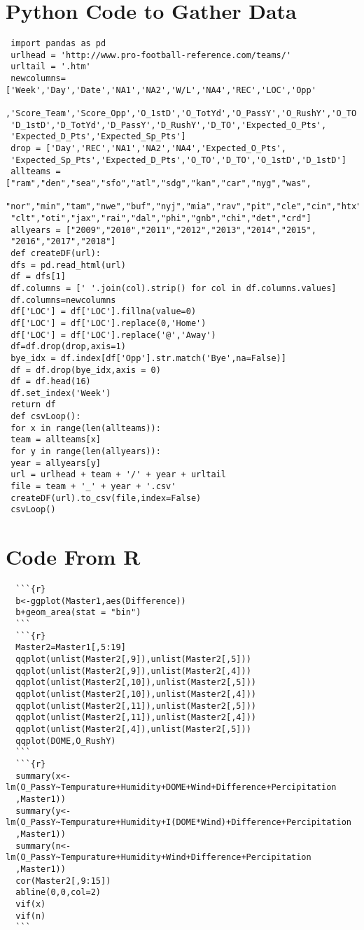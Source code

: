 \documentclass[12pt]{article}
\begin{document}
\begin{appendices}
 \section{Python Code to Gather Data}
 \begin{verbatim}
 import pandas as pd
 urlhead = 'http://www.pro-football-reference.com/teams/'
 urltail = '.htm'
 newcolumns=['Week','Day','Date','NA1','NA2','W/L','NA4','REC','LOC','Opp'
 ,'Score_Team','Score_Opp','O_1stD','O_TotYd','O_PassY','O_RushY','O_TO',
 'D_1stD','D_TotYd','D_PassY','D_RushY','D_TO','Expected_O_Pts',
 'Expected_D_Pts','Expected_Sp_Pts']
 drop = ['Day','REC','NA1','NA2','NA4','Expected_O_Pts',
 'Expected_Sp_Pts','Expected_D_Pts','O_TO','D_TO','O_1stD','D_1stD']
 allteams = ["ram","den","sea","sfo","atl","sdg","kan","car","nyg","was",
 "nor","min","tam","nwe","buf","nyj","mia","rav","pit","cle","cin","htx",
 "clt","oti","jax","rai","dal","phi","gnb","chi","det","crd"]
 allyears = ["2009","2010","2011","2012","2013","2014","2015",
 "2016","2017","2018"]
 def createDF(url):
 dfs = pd.read_html(url)
 df = dfs[1]
 df.columns = [' '.join(col).strip() for col in df.columns.values]
 df.columns=newcolumns
 df['LOC'] = df['LOC'].fillna(value=0)
 df['LOC'] = df['LOC'].replace(0,'Home')
 df['LOC'] = df['LOC'].replace('@','Away')
 df=df.drop(drop,axis=1)
 bye_idx = df.index[df['Opp'].str.match('Bye',na=False)]
 df = df.drop(bye_idx,axis = 0)
 df = df.head(16)
 df.set_index('Week')
 return df
 def csvLoop():
 for x in range(len(allteams)):
 team = allteams[x]
 for y in range(len(allyears)):
 year = allyears[y]
 url = urlhead + team + '/' + year + urltail
 file = team + '_' + year + '.csv'
 createDF(url).to_csv(file,index=False)
 csvLoop()
 \end{verbatim}
  \section{Code From R}
   \begin{verbatim}
  ```{r}
  b<-ggplot(Master1,aes(Difference))
  b+geom_area(stat = "bin")
  ```
  ```{r}
  Master2=Master1[,5:19]
  qqplot(unlist(Master2[,9]),unlist(Master2[,5]))
  qqplot(unlist(Master2[,9]),unlist(Master2[,4]))
  qqplot(unlist(Master2[,10]),unlist(Master2[,5]))
  qqplot(unlist(Master2[,10]),unlist(Master2[,4]))
  qqplot(unlist(Master2[,11]),unlist(Master2[,5]))
  qqplot(unlist(Master2[,11]),unlist(Master2[,4]))
  qqplot(unlist(Master2[,4]),unlist(Master2[,5]))
  qqplot(DOME,O_RushY)
  ```
  ```{r}
  summary(x<-lm(O_PassY~Tempurature+Humidity+DOME+Wind+Difference+Percipitation
  ,Master1))
  summary(y<-lm(O_PassY~Tempurature+Humidity+I(DOME*Wind)+Difference+Percipitation
  ,Master1))
  summary(n<-lm(O_PassY~Tempurature+Humidity+Wind+Difference+Percipitation
  ,Master1))
  cor(Master2[,9:15])
  abline(0,0,col=2)
  vif(x)
  vif(n)
  ```
  \end{verbatim}

\end{appendices}
\end{document}
